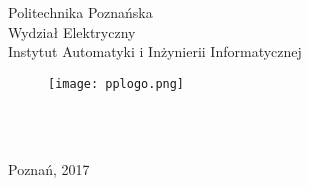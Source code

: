 \thispagestyle{empty}
\begin{center}
Politechnika Poznańska\\
Wydział Elektryczny\\  
Instytut Automatyki i Inżynierii Informatycznej\\
\begin{figure}[ht!]
\hspace{47mm}\texttt{[image: pplogo.png]}
\end{figure}
  \vspace{5mm}
\large{\Student}\\
  \vspace{10mm}
\large{\TytulPolski}\\
  \vspace{10mm}
\end{center}
\vspace{50mm}

\vspace{10mm}
\begin{center}
Poznań, 2017
\end{center}
 
